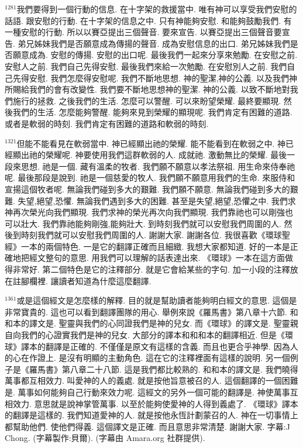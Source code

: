 \documentclass{book}
\begin{document}
$^{1281}$我們要得到一個行動的信息.
在十字架的救援當中.
唯有神可以享受我們安慰的話語.
跟安慰的行動.
在十字架的信息之中.
只有神能夠安慰.
和能夠鼓勵我們.
有一種安慰的行動.
所以以賽亞提出三個聲音.
要來宣告.
以賽亞提出三個聲音要宣告.
弟兄姊妹我們是否願意成為傳揚的聲音.
成為安慰信息的出口.
弟兄姊妹我們是否願意成為.
安慰的傳揚.
安慰的出口呢.
最後我們一起來分享來勉勵.
在安慰之前.
安慰人之前.
我們自己先得安慰.
最後我們來給一次勉勵.
在安慰別人之前.
我們自己先得安慰.
我們怎麼得安慰呢.
我們不斷地思想.
神的聖潔,神的公義.
以及我們神所賜給我們的會有改變性.
我們要不斷地思想神的聖潔.
神的公義.
以致不斷地對我們施行的拯救.
之後我們的生活.
怎麼可以警醒.
可以來盼望榮耀.
最終要顯現.
然後我們的生活.
怎麼能夠警醒.
能夠來見到榮耀的顯現呢.
我們肯定有困難的道路.
或者是軟弱的時刻.
我們肯定有困難的道路和軟弱的時刻.

$^{1321}$但能不能看見在軟弱當中.
神已經顯出祂的榮耀.
能不能看到在軟弱之中.
神已經顯出祂的榮耀呢.
神要使用我們這群軟弱的人.
成就祂.
激動無比的榮耀.
最後一段來思想.
祂是一個.
藏有溫柔的牧者.
我們願不願意以孝法祭祖.
用生命來侍奉祂呢.
最後那段是說到.
祂是一個慈愛的牧人.
我們願不願意用我們的生命.
來服侍和宣揚這個牧者呢.
無論我們碰到多大的艱難.
我們願不願意.
無論我們碰到多大的艱難.
失望,絕望,恐懼.
無論我們遇到多大的困難.
甚至是失望,絕望,恐懼之中.
我們求神再次榮光向我們顯現.
我們求神的榮光再次向我們顯現.
我們靠祂也可以剛強也可以壯大.
我們靠祂能夠剛強,能夠壯大.
到時刻我們就可以安慰我們周圍的人.
然後到時刻我們就可以安慰我們周圍的人.
謝謝大家.
謝謝各位.
我很喜歡《環球聖經》一本的兩個特色.
一是它的翻譯正確而且細緻.
我想大家都知道.
好的一本是正確地把經文整句的意思.
用我們可以理解的話表達出來.
《環球》一本在這方面做得非常好.
第二個特色是它的注釋部分.
就是它會給某些的字句.
加一小段的注釋放在註腳欄裡.
讓讀者知道為什麼這麼翻譯.

$^{1361}$或是這個經文是怎麼樣的解釋.
目的就是幫助讀者能夠明白經文的意思.
這個是非常寶貴的.
這也可以看到翻譯團隊的用心.
舉例來說《羅馬書》第八章十六節.
和和本的譯文是.
聖靈與我們的心同證我們是神的兒女.
而《環球》的譯文是.
聖靈親自向我們的心證實我們是神的兒女.
大部分的譯本和和和本的翻譯相近.
但是《環球》譯本的翻譯是正確的.
不僅僅是原文有這樣的含義.
而且也更合乎神學.
因為人的心在作證上.
是沒有明顯的主動角色.
這在它的注釋裡面有這樣的說明.
另一個例子是《羅馬書》第八章二十八節.
這是我們都比較熟的.
和和本的譯文是.
我們曉得萬事都互相效力.
叫愛神的人的義處.
就是按他旨意被召的人.
這個翻譯的一個困難是.
萬事如何能夠自己行動來效力呢.
這經文的另外一個可能的翻譯是.
神使萬事互相效力.
意思就是說神掌管萬事.
以至於能夠使愛神的人得到義處了.
《環球》譯本的翻譯是這樣的.
我們知道愛神的人.
就是按他永恆計劃蒙召的人.
神在一切事情上都幫助他們.
使他們得義.
這個譯文是正確.
而且意思非常清楚.
謝謝大家.
字幕:J Chong.
(字幕製作:貝爾).
(字幕由 Amara.org 社群提供).
\newpage
\end{document}
